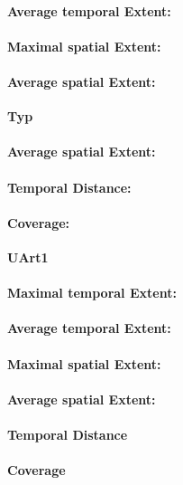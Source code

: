 \begin{table}[ht]
\paragraph{Average temporal Extent:}
\paragraph{Maximal spatial Extent:}
\paragraph{Average spatial Extent:}

\large
\centerline{\textbf{Typ}}
\normalsize

\paragraph{Average spatial Extent:}
\paragraph{Temporal Distance:}
\paragraph{Coverage:}

\large
\centerline{\textbf{UArt1}}
\normalsize

\paragraph{Maximal temporal Extent:}
\paragraph{Average temporal Extent:}
\paragraph{Maximal spatial Extent:}
\paragraph{Average spatial Extent:}
\paragraph{Temporal Distance}
\paragraph{Coverage}

\end{table}
